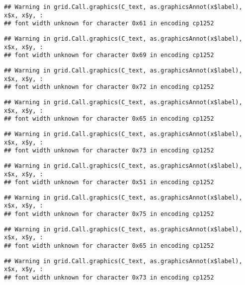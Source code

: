 \documentclass[
]{article}
\begin{document}
\begin{verbatim}
## Warning in grid.Call.graphics(C_text, as.graphicsAnnot(x$label), x$x, x$y, :
## font width unknown for character 0x61 in encoding cp1252
\end{verbatim}

\begin{verbatim}
## Warning in grid.Call.graphics(C_text, as.graphicsAnnot(x$label), x$x, x$y, :
## font width unknown for character 0x69 in encoding cp1252
\end{verbatim}

\begin{verbatim}
## Warning in grid.Call.graphics(C_text, as.graphicsAnnot(x$label), x$x, x$y, :
## font width unknown for character 0x72 in encoding cp1252
\end{verbatim}

\begin{verbatim}
## Warning in grid.Call.graphics(C_text, as.graphicsAnnot(x$label), x$x, x$y, :
## font width unknown for character 0x65 in encoding cp1252
\end{verbatim}

\begin{verbatim}
## Warning in grid.Call.graphics(C_text, as.graphicsAnnot(x$label), x$x, x$y, :
## font width unknown for character 0x73 in encoding cp1252
\end{verbatim}

\begin{verbatim}
## Warning in grid.Call.graphics(C_text, as.graphicsAnnot(x$label), x$x, x$y, :
## font width unknown for character 0x51 in encoding cp1252
\end{verbatim}

\begin{verbatim}
## Warning in grid.Call.graphics(C_text, as.graphicsAnnot(x$label), x$x, x$y, :
## font width unknown for character 0x75 in encoding cp1252
\end{verbatim}

\begin{verbatim}
## Warning in grid.Call.graphics(C_text, as.graphicsAnnot(x$label), x$x, x$y, :
## font width unknown for character 0x65 in encoding cp1252
\end{verbatim}

\begin{verbatim}
## Warning in grid.Call.graphics(C_text, as.graphicsAnnot(x$label), x$x, x$y, :
## font width unknown for character 0x73 in encoding cp1252
\end{verbatim}
\end{document}
